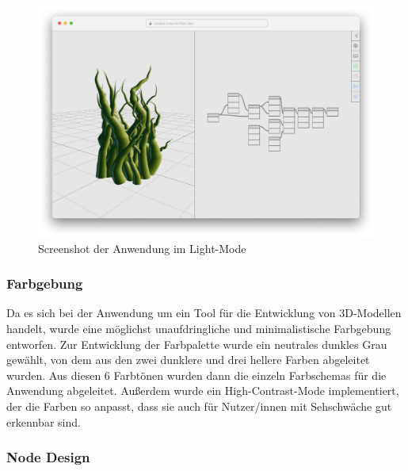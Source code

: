 \documentclass[ngerman]{article}
\begin{document}
\begin{figure}[hbtp]
  \centering
  \includegraphics[width=1\textwidth]{graphics/layout_light.pdf}
  \caption{Screenshot der Anwendung im Light-Mode}
  \label{fig:screenshot_nodarium}
\end{figure}

\subsubsection{Farbgebung}

Da es sich bei der Anwendung um ein Tool für die Entwicklung von 3D-Modellen handelt, wurde eine  möglichst unaufdringliche und minimalistische Farbgebung entworfen.
Zur Entwicklung der Farbpalette wurde ein neutrales dunkles Grau gewählt, von dem aus den zwei dunklere und drei hellere Farben abgeleitet wurden. Aus diesen 6 Farbtönen wurden dann die einzeln Farbschemas für die Anwendung abgeleitet. Außerdem wurde ein High-Contrast-Mode implementiert, der die Farben so anpasst, dass sie auch für Nutzer/innen mit Sehschwäche gut erkennbar sind.

\subsubsection{Node Design}
\end{document}
